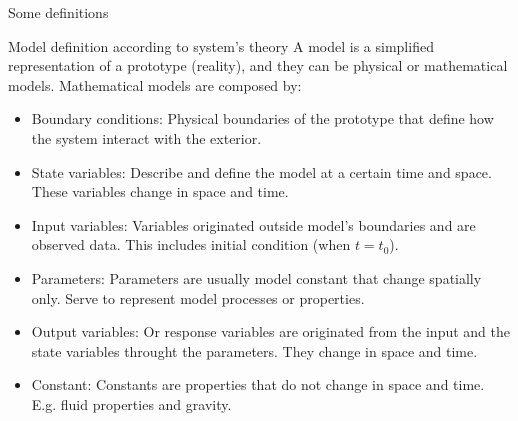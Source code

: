 \documentclass[8pt]{beamer}
\begin{document}
\begin{frame}{Some definitions}
    \begin{block}{Model definition according to system's theory}
        A model is a simplified representation of a prototype (reality), and they can be physical or mathematical models. Mathematical models are composed by:
        \begin{itemize}
            \item \alert{Boundary conditions}: Physical boundaries of the prototype that define how the system interact with the exterior. 
            \item \alert{State variables}: Describe and  define the model at a certain time and space. These variables change in space and time.  
            \item \alert{Input variables}: Variables originated outside model's boundaries and are observed data. This includes initial condition (when $t=t_0$).
            \item \alert{Parameters}: Parameters are usually model constant that change spatially only. Serve to represent model processes or properties.  
            \item \alert{Output variables}: Or response variables are originated from the input and the state variables throught the parameters. They change in space and time. 
            \item \alert{Constant}: Constants are properties that do not change in space and time. E.g. fluid properties and gravity. 
        \end{itemize}
    \end{block}    
\end{frame}
\end{document}
